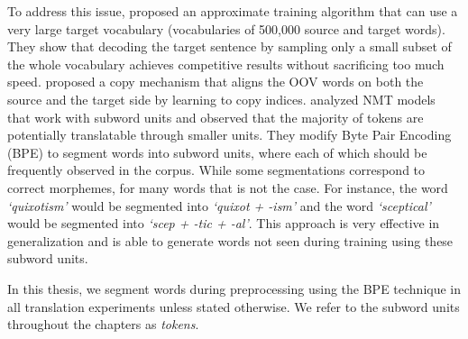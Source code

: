 To address this issue, \citet{jean-etal-2015-using} proposed an approximate training algorithm that can use a very large target vocabulary (vocabularies of 500,000 source and target words). 
They show that decoding the target sentence by sampling only a small subset of the whole vocabulary achieves competitive results without sacrificing too much speed.
\citet{luong2014addressing} proposed a copy mechanism that aligns the OOV words on both the source and the target side by learning to copy indices.
\citet{sennrich-haddow-birch:2016:P16-12} analyzed NMT models that work with subword units and observed that the majority of tokens are potentially translatable through smaller units. 
They modify Byte Pair Encoding (BPE) \citep{10.5555/177910.177914} to segment words into subword units, where each of which should be frequently observed in the corpus. 
While some segmentations correspond to correct morphemes, for many words that is not the case. 
For instance, the word \textit{`quixotism'} would be segmented into \textit{`quixot + -ism'} and the word \textit{`sceptical'} would be segmented into \textit{`scep + -tic + -al'}.
This approach is very effective in generalization and is able to generate words not seen during training using these subword units.

In this thesis, we segment words during preprocessing using the BPE technique in all translation experiments unless stated otherwise.
We refer to the subword units throughout the chapters as \textit{tokens}. 
